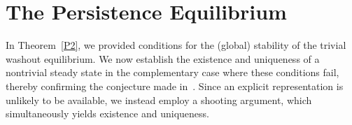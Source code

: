 \documentclass[reqno,11pt]{amsart}
\numberwithin{equation}{section}
\begin{document}
 



\section{The Persistence Equilibrium}\label{SS4.2} 

In Theorem~\ref{P2}, we provided conditions for the (global) stability of the trivial washout equilibrium. We now establish the existence and uniqueness of a nontrivial steady state in the complementary case where these conditions fail, thereby confirming the conjecture made in~\cite{GHE21}. Since an explicit representation is unlikely to be available, we instead employ a shooting argument, which simultaneously yields existence and uniqueness.\\
\end{document}
